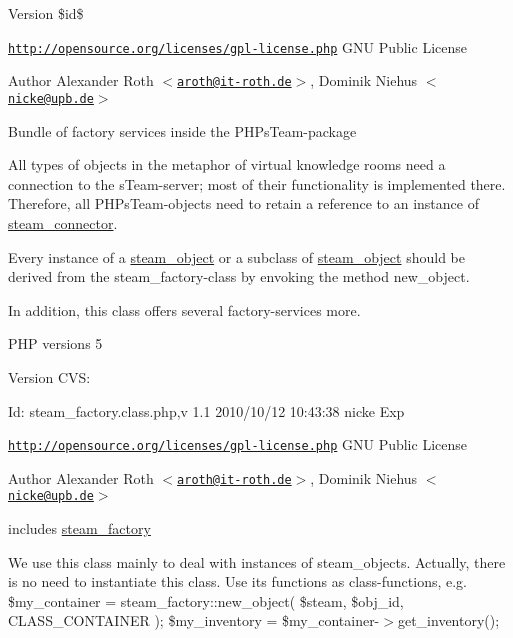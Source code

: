 \begin{DoxyVersion}{Version}
\$id\$
\end{DoxyVersion}
\href{http://opensource.org/licenses/gpl-license.php}{\tt http://opensource.org/licenses/gpl-\/license.php} GNU Public License \begin{DoxyAuthor}{Author}
Alexander Roth $<$\href{mailto:aroth@it-roth.de}{\tt aroth@it-\/roth.de}$>$, Dominik Niehus $<$\href{mailto:nicke@upb.de}{\tt nicke@upb.de}$>$
\end{DoxyAuthor}
Bundle of factory services inside the PHPsTeam-\/package

All types of objects in the metaphor of virtual knowledge rooms need a connection to the sTeam-\/server; most of their functionality is implemented there. Therefore, all PHPsTeam-\/objects need to retain a reference to an instance of \hyperlink{classsteam__connector}{steam\_\-connector}.

Every instance of a \hyperlink{classsteam__object}{steam\_\-object} or a subclass of \hyperlink{classsteam__object}{steam\_\-object} should be derived from the steam\_\-factory-\/class by envoking the method new\_\-object.

In addition, this class offers several factory-\/services more.

PHP versions 5

\begin{DoxyVersion}{Version}
CVS: 
\end{DoxyVersion}
\begin{DoxyParagraph}{Id:}
steam\_\-factory.class.php,v 1.1 2010/10/12 10:43:38 nicke Exp 
\end{DoxyParagraph}


\href{http://opensource.org/licenses/gpl-license.php}{\tt http://opensource.org/licenses/gpl-\/license.php} GNU Public License \begin{DoxyAuthor}{Author}
Alexander Roth $<$\href{mailto:aroth@it-roth.de}{\tt aroth@it-\/roth.de}$>$, Dominik Niehus $<$\href{mailto:nicke@upb.de}{\tt nicke@upb.de}$>$
\end{DoxyAuthor}
includes \hyperlink{classsteam__factory}{steam\_\-factory}

We use this class mainly to deal with instances of steam\_\-objects. Actually, there is no need to instantiate this class. Use its functions as class-\/functions, e.g. {\ttfamily  \$my\_\-container = steam\_\-factory::new\_\-object( \$steam, \$obj\_\-id, CLASS\_\-CONTAINER ); \$my\_\-inventory = \$my\_\-container-\/$>$get\_\-inventory(); }


